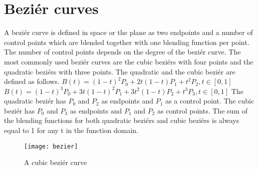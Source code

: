 \section{Beziér curves}\label{bezier}
A beziér curve is defined in space or the plane as two endpoints and a number of control points which are blended together with one blending function per point. The number of control points depends on the degree of the beziér curve. The most commonly used beziér curves are the cubic beziérs with four points and the quadratic beziérs with three points. The quadratic and the cubic beziér are defined as follows.\vspace{\baselineskip}\newline
\begin{math}
B(t) = (1-t)^2P_0+2t(1-t)P_1+t^2P_2, t\in[0, 1] 
\end{math} \vspace{\baselineskip}\newline
\begin{math}
B(t) = (1 - t)^3P_0 + 3t(1 - t)^2P_1 + 3t^2(1 - t)P_2 + t^3P_3, t\in[0, 1]
\end{math} \vspace{\baselineskip}\newline
The quadratic beziér has $P_0$ and $P_2$ as endpoints and $P_1$ as a control point. The cubic beziér has $P_0$ and $P_3$ as endpoints and $P_1$ and $P_2$ as control points. The sum of the blending functions for both quadratic beziérs and cubic beziérs is always equal to 1 for any t in the function domain.\citep{PFNP}

\begin{figure}[H]
\centerline{\texttt{[image: bezier]}}
\caption{A cubic beziér curve}
\end{figure}

